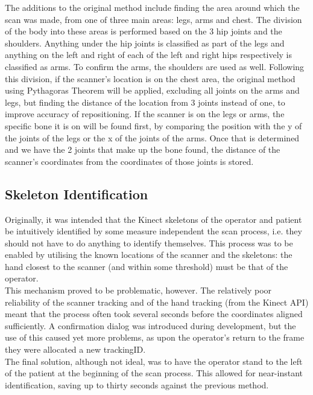 The additions to the original method include finding the area around which the scan was made, from one of three main areas: legs, arms and chest. The division of the body into these areas is performed based on the 3 hip joints and the shoulders. Anything under the hip joints is classified as part of the legs and anything on the left and right of each of the left and right hips respectively is classified as arms. To confirm the arms, the shoulders are used as well. Following this division, if the scanner's location is on the chest area, the original method using Pythagoras Theorem will be applied, excluding all joints on the arms and legs, but finding the distance of the location from 3 joints instead of one, to improve accuracy of repositioning. If the scanner is on the legs or arms, the specific bone it is on will be found first, by comparing the position with the y of the joints of the legs or the x of the joints of the arms. Once that is determined and we have the 2 joints that make up the bone found, the distance of the scanner's coordinates from the coordinates of those joints is stored.\\

\subsection{Skeleton Identification}
Originally, it was intended that the Kinect skeletons of the operator and patient be intuitively identified by some measure independent the scan process, i.e. they should not have to do anything to identify themselves. This process was to be enabled by utilising the known locations of the scanner and the skeletons: the hand closest to the scanner (and within some threshold) must be that of the operator.\\

This mechanism proved to be problematic, however. The relatively poor reliability of the scanner tracking and of the hand tracking (from the Kinect API) meant that the process often took several seconds before the coordinates aligned sufficiently. A confirmation dialog was introduced during development, but the use of this caused yet more problems, as upon the operator's return to the frame they were allocated a new trackingID.\\

The final solution, although not ideal, was to have the operator stand to the left of the patient at the beginning of the scan process. This allowed for near-instant identification, saving up to thirty seconds against the previous method.\\

